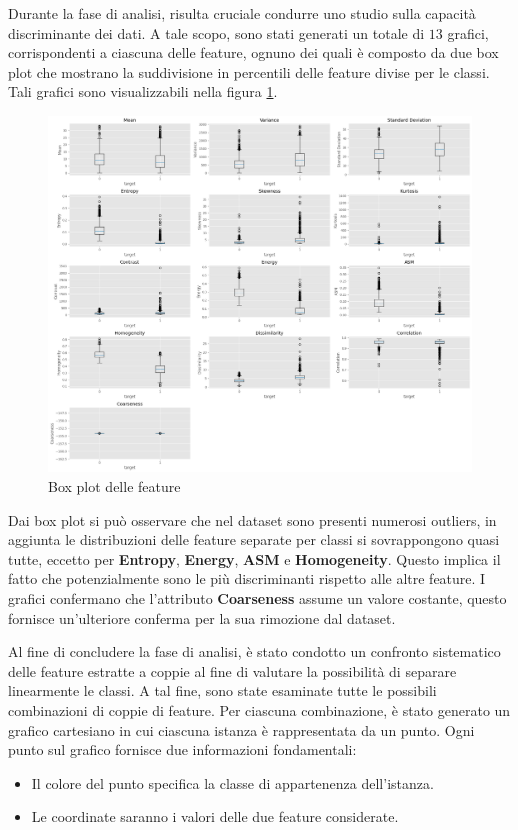 Durante la fase di analisi, risulta cruciale condurre uno studio sulla capacità
discriminante dei dati. A tale scopo, sono stati generati un totale di $13$
grafici, corrispondenti a ciascuna delle feature, ognuno dei quali è composto da 
due box plot che mostrano la suddivisione in percentili delle feature divise per 
le classi. Tali grafici sono visualizzabili nella figura \ref{fig:boxplot_feature}.
\newpage
\begin{figure}[!ht]
      \centering
      \includegraphics[width=\textwidth]{img/analisi/boxplot.png}
      \caption{Box plot delle feature}
      \label{fig:boxplot_feature}
\end{figure}

Dai box plot si può osservare che nel dataset sono presenti numerosi outliers, in
aggiunta le distribuzioni delle feature separate per classi si sovrappongono
quasi tutte, eccetto per \textbf{Entropy}, \textbf{Energy}, \textbf{ASM} e
\textbf{Homogeneity}. Questo implica il fatto che potenzialmente sono le più
discriminanti rispetto alle altre feature. I grafici confermano che l'attributo
\textbf{Coarseness} assume un valore costante, questo fornisce un'ulteriore
conferma per la sua rimozione dal dataset.

Al fine di concludere la fase di analisi, è stato condotto un confronto
sistematico delle feature estratte a coppie al fine di valutare la possibilità
di separare linearmente le classi. A tal fine, sono state esaminate tutte le
possibili combinazioni di coppie di feature. Per ciascuna combinazione, è stato
generato un grafico cartesiano in cui ciascuna istanza è rappresentata da un
punto. Ogni punto sul grafico fornisce due informazioni fondamentali:
\begin{itemize}
      \item Il colore del punto specifica la classe di appartenenza dell'istanza.
      \item Le coordinate saranno i valori delle due feature considerate.
\end{itemize}

